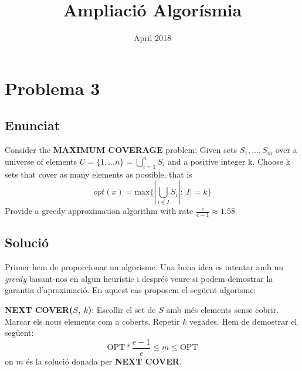 \documentclass{article}
\title{Ampliació Algorísmia}
\date{April 2018}
\begin{document}
\maketitle

\section{Problema 3}
\subsection{Enunciat}
Consider the \textbf{MAXIMUM COVERAGE} problem: Given sets $S_1,...,S_m$ over a universe of elements $U = \{1,...n\} = \bigcup_{i=1}^{n} S_i$ and a positive integer k. Choose k sets that cover as many elements as possible, that is \[
opt(x) = \text{max}\{|\bigcup_{i \in I} S_i| : |I| = k\}
\]
Provide a greedy approximation algorithm with rate $\frac{e}{e-1} \approx 1.58$
\subsection{Solució}
Primer hem de proporcionar un algorisme. Una bona idea es intentar amb un \textit{greedy} basant-nos en algun heurístic i després veure si podem demostrar la garantia d'aproximació.
En aquest cas proposem el següent algorisme:
\newline
\par
\textbf{NEXT COVER($S$, $k$)}: Escollir el set de $S$ amb més elements sense cobrir. Marcar els nous elements com a coberts. Repetir $k$ vegades.
\newline
\newline
Hem de demostrar el següent:
\[
\text{OPT}*\frac{e-1}{e} \leq m \leq \text{OPT}
\]
on $m$ és la solució donada per \textbf{NEXT COVER}.
\newpage
\end{document}

